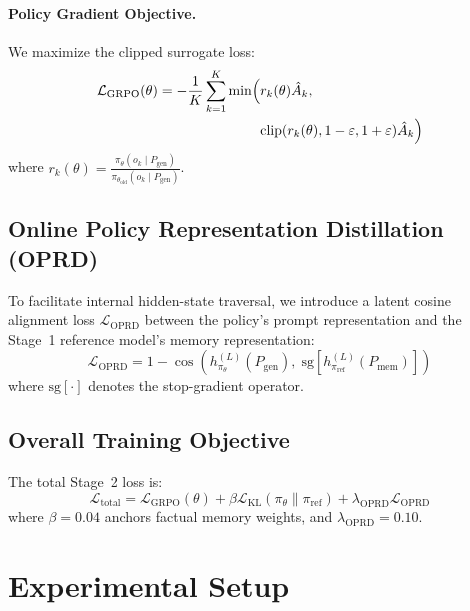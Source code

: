 \documentclass[11pt]{article}
\newcommand{\sgop}[1]{\text{sg}\!\left[#1\right]}
\newcommand{\Lgrpo}{\mathcal{L}_{\text{GRPO}}}
\newcommand{\Lkl}{\mathcal{L}_{\text{KL}}}
\newcommand{\Loprd}{\mathcal{L}_{\text{OPRD}}}
\newcommand{\Pmem}{P_{\text{mem}}}
\newcommand{\Pgen}{P_{\text{gen}}}
\theoremstyle{definition}
\begin{document}
\paragraph{Policy Gradient Objective.} We maximize the clipped surrogate loss:
\begin{equation}
\begin{aligned}
  \Lgrpo(\theta) = - \frac{1}{K} \sum_{k=1}^K \min \Bigl( & r_k(\theta) \hat{A}_k, \\
  & \text{clip}(r_k(\theta), 1-\varepsilon, 1+\varepsilon) \hat{A}_k \Bigr)
\end{aligned}
\end{equation}
where $r_k(\theta) = \frac{\pi_\theta(o_k \mid \Pgen)}{\pi_{\theta_{\text{old}}}(o_k \mid \Pgen)}$.

\subsection{Online Policy Representation Distillation (OPRD)}

To facilitate internal hidden-state traversal, we introduce a latent cosine alignment loss $\Loprd$ between the policy's prompt representation and the Stage~1 reference model's memory representation:
\begin{equation}
  \Loprd = 1 - \cos\!\left( h_{\pi_\theta}^{(L)}(\Pgen),\; \sgop{h_{\pi_{\text{ref}}}^{(L)}(\Pmem)} \right)
\end{equation}
where $\sgop{\cdot}$ denotes the stop-gradient operator.

\subsection{Overall Training Objective}

The total Stage~2 loss is:
\begin{equation}
  \mathcal{L}_{\text{total}} = \Lgrpo(\theta) + \beta \Lkl(\pi_\theta \parallel \pi_{\text{ref}}) + \lambda_{\text{OPRD}} \Loprd
\end{equation}
where $\beta = 0.04$ anchors factual memory weights, and $\lambda_{\text{OPRD}} = 0.10$.

\section{Experimental Setup}\label{sec:setup}
\end{document}
